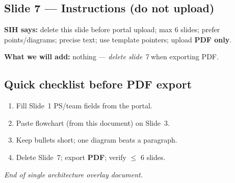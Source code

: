 \documentclass[11pt,a4paper]{article}
\begin{document}
\subsection{Slide 7 --- Instructions (do not upload)}

\textbf{SIH says:} delete this slide before portal upload; max 6 slides; prefer points/diagrams;
precise text; use template pointers; upload \textbf{PDF only}.

\textbf{What we will add:} nothing --- \emph{delete slide 7} when exporting PDF.

\subsection{Quick checklist before PDF export}

\begin{enumerate}[nosep,leftmargin=*]
  \item Fill Slide~1 PS/team fields from the portal.
  \item Paste flowchart (from this document) on Slide~3.
  \item Keep bullets short; one diagram beats a paragraph.
  \item Delete Slide~7; export \textbf{PDF}; verify $\leq$ 6 slides.
\end{enumerate}

\vspace{1.2em}
\noindent\textit{End of single architecture overlay document.}
\end{document}
